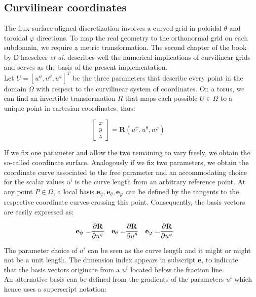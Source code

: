 \subsection{Curvilinear coordinates}
\label{ssec:MetricCurvilinearCoordinates}

The flux-surface-aligned discretization involves a curved grid in poloidal $\theta$ and toroidal $\varphi$ directions. To map the real geometry to the orthonormal grid on each subdomain, we require a metric transformation. The second chapter of the book by D’haeseleer \emph{et al.}\cite{CurvilinearGrids} describes well the numerical implications of curvilinear grids and serves as the basis of the present implementation. \\

Let $U=[u^\psi, u^\theta, u^\varphi]^T$ be the three parameters that describe every point in the domain $\Omega$ with respect to the curvilinear system of coordinates. On a torus, we can find an invertible transformation $R$ that maps each possible $U\in\Omega$ to a unique point in cartesian coordinates, thus: 

\begin{equation}
	\begin{bmatrix} x \\ y \\ z\end{bmatrix} = \mathbf{R}(u^\psi, u^\theta, u^\varphi)
\end{equation}

If we fix one parameter and allow the two remaining to vary freely, we obtain the so-called coordinate surface. Analogously if we fix two parameters, we obtain the coordinate curve associated to the free parameter and an accommodating choice for the scalar values $u^i$ is the curve length from an arbitrary reference point. At any point $P\in\Omega$, a local basis ${\mathbf{e}_\psi, \mathbf{e}_\theta, \mathbf{e}_\varphi}$ can be defined by the tangents to the respective coordinate curves crossing this point. Consequently, the basis vectors are easily expressed as:

\begin{align}
	\mathbf{e}_\psi =& \pdv{\mathbf{R}}{u^\psi} & \mathbf{e}_\theta =& \pdv{\mathbf{R}}{u^\theta} & \mathbf{e}_\varphi =& \pdv{\mathbf{R}}{u^\varphi}
\end{align}

The parameter choice of $u^i$ can be seen as the curve length and it might or might not be a unit length. The dimension index appears in subscript $\mathbf{e}_i$ to indicate that the basis vectors originate from a $u^i$ located below the fraction line. \\
An alternative basis can be defined from the gradients of the parameters $u^i$ which hence uses a superscript notation:  

